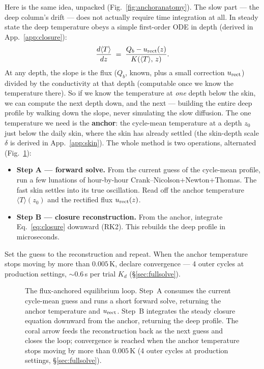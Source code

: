 \documentclass[11pt]{report}
\newcommand{\Tm}{\langle T\rangle}
\begin{document}
\noindent Here is the same idea, unpacked (Fig.~\ref{fig:anchoranatomy}). The
slow part --- the deep column's drift --- does not actually require time
integration at all. In steady state the deep temperature
obeys a simple first-order ODE in depth (derived in App.~\ref{app:closure}):
\begin{equation}
\frac{d\Tm}{dz} \;=\; \frac{Q_b - u_{\rm rect}(z)}{K(\Tm,\,z)}.
\label{eq:closure}
\end{equation}
At any depth, the slope is the flux ($Q_b$, known, plus a small correction
$u_{\rm rect}$) divided by the conductivity at that depth (computable once we
know the temperature there). So if we know the temperature at \emph{one} depth
below the skin, we can compute the next depth down, and the next --- building the
entire deep profile by walking down the slope, never simulating the slow
diffusion. The one temperature we need is the \textbf{anchor}: the cycle-mean
temperature at a depth $z_0$ just below the daily skin, where the skin has
already settled (the skin-depth scale $\delta$ is derived in App.~\ref{app:skin}).
The whole method is two operations, alternated
(Fig.~\ref{fig:fluxanchored}):

\begin{itemize}[leftmargin=1.4em,itemsep=3pt]
\item \textbf{Step A --- forward solve.} From the current guess of the cycle-mean
  profile, run a few lunations of hour-by-hour Crank--Nicolson+Newton+Thomas.
  The fast skin settles into its true oscillation. Read off the anchor
  temperature $\Tm(z_0)$ and the rectified flux $u_{\rm rect}(z)$.
\item \textbf{Step B --- closure reconstruction.} From the anchor, integrate
  Eq.~\eqref{eq:closure} downward (RK2). This rebuilds the deep profile in
  microseconds.
\end{itemize}
\noindent Set the guess to the reconstruction and repeat. When the anchor
temperature stops moving by more than $0.005$\,K, declare convergence --- 4
outer cycles at production settings, $\sim$0.6\,s per trial $K_d$ (\S\ref{sec:fullsolve}).

\begin{figure}[htbp]\centering

\caption{The flux-anchored equilibrium loop. Step~A consumes the current
cycle-mean guess and runs a short forward solve, returning the anchor
temperature and $u_{\rm rect}$. Step~B integrates the steady closure equation
downward from the anchor, returning the deep profile. The coral arrow feeds the
reconstruction back as the next guess and closes the loop; convergence is reached
when the anchor temperature stops moving by more than $0.005$\,K (4 outer
cycles at production settings, \S\ref{sec:fullsolve}).}
\label{fig:fluxanchored}
\end{figure}
\end{document}
